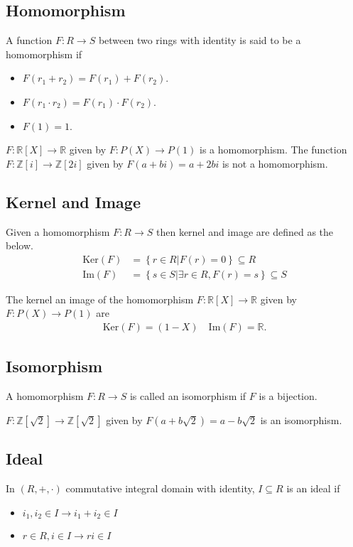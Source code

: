 \documentclass[10pt]{amsart}
\newcommand{\Z}{\mathbb{Z}}
\newcommand{\R}{\mathbb{R}}
\newcommand{\ra}{\rightarrow}
\renewcommand{\ker}[1]{\text{Ker}\left(#1\right)}
\newcommand{\im}[1]{\text{Im}\left(#1\right)}
\begin{document}
\subsection{Homomorphism}%
\label{sub:homomorphism}

A function $F:R\ra S$ between two rings with identity is said to be a
homomorphism if
\begin{itemize}
  \item $F(r_1+r_2)=F(r_1)+F(r_2)$.
  \item $F(r_1\cdot r_2)=F(r_1)\cdot F(r_2)$.
  \item $F(1)=1$.
\end{itemize}

$F:\R[X]\ra\R$ given by $F:P(X)\ra P(1)$ is a homomorphism. The function
$F:\Z[i]\ra\Z[2i]$ given by $F(a+bi)=a+2bi$ is not a homomorphism.

\subsection{Kernel and Image}%
\label{sub:kernel_and_image}

Given a homomorphism $F:R\ra S$ then kernel and image are defined as the below.
\begin{align*}
  \ker{F}&=\left\{r\in R\vert F(r)=0\right\}\subseteq R\\
  \im{F}&=\left\{s\in S\vert \exists r\in R, F(r)=s\right\}\subseteq S
\end{align*}

The kernel an image of the homomorphism $F:\R[X]\ra\R$ given by $F:P(X)\ra
P(1)$ are
\begin{align*}
  \ker{F}=(1-X)\quad\im{F}=\R.
\end{align*}

\subsection{Isomorphism}%
\label{sub:isomorphism}

A homomorphism $F:R\ra S$ is called an isomorphism if $F$ is a bijection.

$F:\Z[\sqrt{2}]\ra\Z[\sqrt{2}]$ given by $F(a+b\sqrt{2})=a-b\sqrt{2}$ is an
isomorphism.

\subsection{Ideal}%
\label{sub:ideal}

In $(R,+,\cdot)$ commutative integral domain with identity, $I\subseteq R$ is an
ideal if
\begin{itemize}
  \item $i_1,i_2\in I\ra i_1+i_2\in I$
  \item $r\in R,i\in I\ra ri\in I$
\end{itemize}
\end{document}
